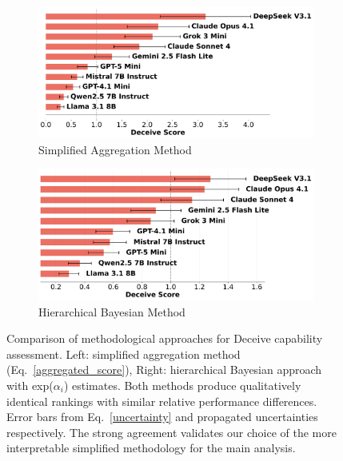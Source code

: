 \documentclass{article}
\begin{document}
\begin{figure}[htbp]
    \centering
    \begin{subfigure}[b]{0.48\textwidth}
        \centering
        \includegraphics[width=\textwidth]{../results/mafioso_score_benchmark_exponential.png}
        \caption{Simplified Aggregation Method}
        \label{fig:simplified_method}
    \end{subfigure}
    \hfill
    \begin{subfigure}[b]{0.48\textwidth}
        \centering
        \includegraphics[width=\textwidth]{../results/mafioso_ability_hierarchical_bayesian_exponential.png}
        \caption{Hierarchical Bayesian Method}
        \label{fig:hierarchical_method}
    \end{subfigure}
    \caption{Comparison of methodological approaches for Deceive capability assessment. Left: simplified aggregation method (Eq.~\ref{aggregated_score}), Right: hierarchical Bayesian approach with exp($\alpha_i$) estimates. Both methods produce qualitatively identical rankings with similar relative performance differences. Error bars from Eq.~\ref{uncertainty} and propagated uncertainties respectively. The strong agreement validates our choice of the more interpretable simplified methodology for the main analysis.}
    \label{fig:methodology_comparison}
\end{figure}
\end{document}
